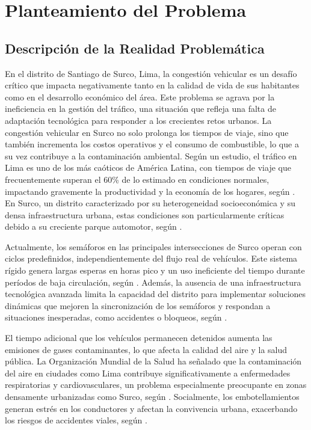 \chapter{Planteamiento del Problema}
\section{Descripción de la Realidad Problemática}
En el distrito de Santiago de Surco, Lima, la congestión vehicular es un desafío crítico que impacta negativamente tanto en la calidad de vida de sus habitantes como en el desarrollo económico del área. Este problema se agrava por la ineficiencia en la gestión del tráfico, una situación que refleja una falta de adaptación tecnológica para responder a los crecientes retos urbanos. La congestión vehicular en Surco no solo prolonga los tiempos de viaje, sino que también incrementa los costos operativos y el consumo de combustible, lo que a su vez contribuye a la contaminación ambiental. Según un estudio, el tráfico en Lima es uno de los más caóticos de América Latina, con tiempos de viaje que frecuentemente superan el 60\% de lo estimado en condiciones normales, impactando gravemente la productividad y la economía de los hogares, según \cite{swarco2024}. En Surco, un distrito caracterizado por su heterogeneidad socioeconómica y su densa infraestructura urbana, estas condiciones son particularmente críticas debido a su creciente parque automotor, según \cite{sabogal2019}.

Actualmente, los semáforos en las principales intersecciones de Surco operan con ciclos predefinidos, independientemente del flujo real de vehículos. Este sistema rígido genera largas esperas en horas pico y un uso ineficiente del tiempo durante períodos de baja circulación, según \cite{wagner2024}. Además, la ausencia de una infraestructura tecnológica avanzada limita la capacidad del distrito para implementar soluciones dinámicas que mejoren la sincronización de los semáforos y respondan a situaciones inesperadas, como accidentes o bloqueos, según \cite{sabogal2019}.

El tiempo adicional que los vehículos permanecen detenidos aumenta las emisiones de gases contaminantes, lo que afecta la calidad del aire y la salud pública. La Organización Mundial de la Salud ha señalado que la contaminación del aire en ciudades como Lima contribuye significativamente a enfermedades respiratorias y cardiovasculares, un problema especialmente preocupante en zonas densamente urbanizadas como Surco, según \cite{swarco2024}. Socialmente, los embotellamientos generan estrés en los conductores y afectan la convivencia urbana, exacerbando los riesgos de accidentes viales, según \cite{wagner2024}.

